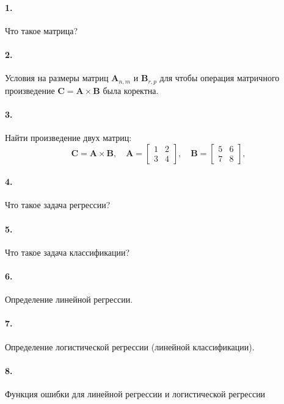 \documentclass[12pt, twoside]{article}
\begin{document}
 

\paragraph{1.} Что такое матрица?

\paragraph{2.} Условия на размеры матриц $\textbf{A}_{n, m}$ и  $\textbf{B}_{r, p}$ для чтобы операция матричного произведение $\textbf{C} = \textbf{A}\times\textbf{B}$ была коректна.

\paragraph{3.} Найти произведение двух матриц:
$$\textbf{C} = \textbf{A}\times\textbf{B}, 
\quad \textbf{A} = 
\begin{bmatrix}
1&2\\
3&4
\end{bmatrix},
\quad \textbf{B} = 
\begin{bmatrix}
5&6\\
7&8
\end{bmatrix},
$$

\paragraph{4.} Что такое задача регрессии?

\paragraph{5.} Что такое задача классификации?

\paragraph{6.} Определение линейной регрессии.

\paragraph{7.} Определение логистической регрессии (линейной классификации).

\paragraph{8.} Функция ошибки для линейной регрессии и логистической регрессии
\end{document}
